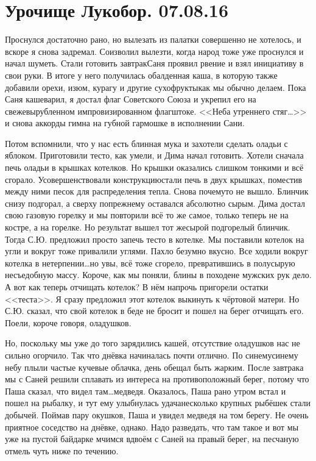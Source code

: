 \chapter{Урочище Лукобор. 07.08.16} 

Проснулся достаточно рано, но вылезать из палатки совершенно не хотелось, и вскоре я снова задремал. Соизволил вылезти, когда народ тоже уже проснулся и начал шуметь. Стали готовить завтрак\mdash Саня проявил рвение и взял инициативу в свои руки. В итоге у него получилась обалденная каша, в которую также добавили орехи, изюм, курагу и другие сухофрукты\mdash как мы обычно делаем. Пока Саня кашеварил, я достал флаг Советского Союза и укрепил его на свежевырубленном импровизированном флагштоке. <<Неба утреннего стяг\ldots >> и снова аккорды гимна на губной гармошке в исполнении Сани. 

Потом вспомнили, что у нас есть блинная мука и захотели сделать оладьи с яблоком. Приготовили тесто, как умели, и Дима начал готовить. Хотели сначала печь оладьи в крышках котелков. Но крышки оказались слишком тонкими и всё сгорало. Усовершенствовали конструкцию\mdash стали печь в двух крышках, поместив между ними песок для распределения тепла. Снова почему\sdash то не вышло. Блинчик снизу подгорал, а сверху по\sdash прежнему оставался абсолютно сырым. Дима достал свою газовую горелку и мы повторили всё то же самое, только теперь не на костре, а на горелке. Но результат вышел тот же\mdash сырой подгорелый блинчик. Тогда С.Ю. предложил просто запечь тесто в котелке. Мы поставили котелок на угли и вокруг тоже привалили углями. Пахло безумно вкусно. Все ходили вокруг котелка в нетерпении\ldots  но увы, всё тоже сгорело, превратившись в полусырую несъедобную массу. Короче, как мы поняли, блины в походе\mdash не мужских рук дело. А вот как теперь отчищать котелок? В нём напрочь пригорели остатки <<теста>>. Я сразу предложил этот котелок выкинуть к чёртовой матери. Но С.Ю. сказал, что свой котелок в беде не бросит и пошел на берег отчищать его. Поели, короче говоря, оладушков.

Но, поскольку мы уже до того зарядились кашей, отсутствие оладушков нас не сильно огорчило. Так что днёвка начиналась почти отлично. По синему\sdash синему небу плыли частые кучевые облачка, день обещал быть жарким. После завтрака мы с Саней решили сплавать из интереса на противоположный берег, потому что Паша сказал, что видел там\ldots  медведя. Оказалось, Паша рано утром встал и пошел на рыбалку, и тут ему улыбнулась удача\mdash несколько крупных рыбёшек стали добычей. Поймав пару окушков, Паша и увидел медведя на том берегу. Не очень приятное соседство на днёвке, однако. Надо разведать, что там такое и вот мы уже на пустой байдарке мчимся вдвоём с Саней на правый берег, на песчаную отмель чуть ниже по течению. 

